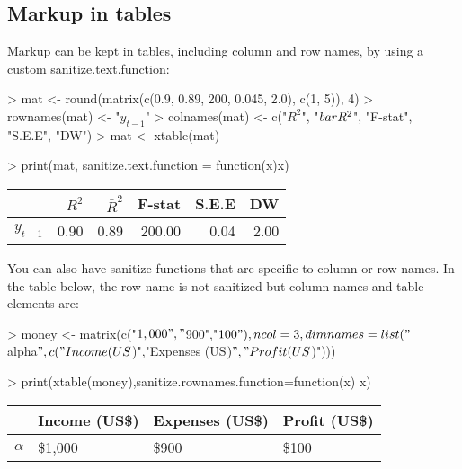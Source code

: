 \documentclass[letterpaper]{article}
\begin{document}
\subsection{Markup in tables}

Markup can be kept in tables, including column and row names, by using a custom sanitize.text.function:

\begin{Schunk}
\begin{Sinput}
> mat <- round(matrix(c(0.9, 0.89, 200, 0.045, 2.0), c(1, 5)), 4)
> rownames(mat) <- "$y_{t-1}$"
> colnames(mat) <- c("$R^2$", "$\\bar{R}^2$", "F-stat", "S.E.E", "DW")
> mat <- xtable(mat)
\end{Sinput}
\end{Schunk}
\begin{Schunk}
\begin{Sinput}
> print(mat, sanitize.text.function = function(x){x})
\end{Sinput}
% latex table generated in R 3.1.1 by xtable 1.7-3 package
% 
\begin{table}[ht]
\centering
\begin{tabular}{rrrrrr}
  \hline
 & $R^2$ & $\bar{R}^2$ & F-stat & S.E.E & DW \\ 
  \hline
$y_{t-1}$ & 0.90 & 0.89 & 200.00 & 0.04 & 2.00 \\ 
   \hline
\end{tabular}
\end{table}\end{Schunk}

You can also have sanitize functions that are specific to column or row names.  In the table below, the row name is not sanitized but column names and table elements are:
\begin{Schunk}
\begin{Sinput}
> money <- matrix(c("$1,000","$900","$100"),ncol=3,dimnames=list("$\\alpha$",c("Income (US$)","Expenses (US$)","Profit (US$)")))
\end{Sinput}
\end{Schunk}
\begin{Schunk}
\begin{Sinput}
> print(xtable(money),sanitize.rownames.function=function(x) {x})
\end{Sinput}
% latex table generated in R 3.1.1 by xtable 1.7-3 package
% 
\begin{table}[ht]
\centering
\begin{tabular}{rlll}
  \hline
 & Income (US\$) & Expenses (US\$) & Profit (US\$) \\ 
  \hline
$\alpha$ & \$1,000 & \$900 & \$100 \\ 
   \hline
\end{tabular}
\end{table}\end{Schunk}
\end{document}

